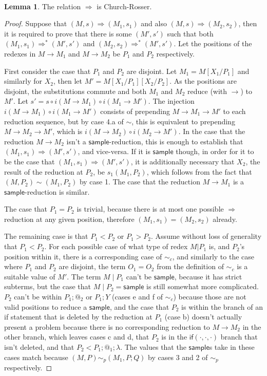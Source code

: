 \documentclass{article}
\newcommand{\tif}[3]{\mathsf{if}(#1, #2, #3)} %
\newcommand{\tsample}{\mathsf{sample}}
\theoremstyle{definition}
\theoremstyle{lemma}
\newtheorem{lemma}{Lemma}
\theoremstyle{remark}
\begin{document}
\paragraph{}
\begin{lemma}
The relation $\Rightarrow$ is Church-Rosser.
\end{lemma}
\begin{proof}
Suppose that $(M,s) \Rightarrow (M_1,s_1)$ and also $(M,s) \Rightarrow (M_2,s_2)$, then it is required to prove that there is some $(M',s')$ such that both $(M_1,s_1) \Rightarrow^* (M',s')$ and $(M_2,s_2) \Rightarrow^* (M',s')$. Let the positions of the redexes in $M \to M_1$ and $M \to M_2$ be $P_1$ and $P_2$ respectively.

First consider the case that $P_1$ and $P_2$ are disjoint. Let $M_1 = M[X_1/P_1]$ and similarly for $X_2$, then let $M' = M[X_1/P_1][X_2/P_2]$. As the positions are disjoint, the substitutions commute and both $M_1$ and $M_2$ reduce (with $\to$) to $M'$. 
Let $s' = s \circ i(M \to M_1) \circ i(M_1 \to M')$. 
The injection $i(M \to M_1) \circ i(M_1 \to M')$ consists of prepending $M \to M_1 \to M'$ to each reduction sequence, but by case 4.a of $\sim$, this is equivalent to prepending $M \to M_2 \to M'$, which is $i(M \to M_2) \circ i(M_2 \to M')$. 
In the case that the reduction $M \to M_2$ isn't a $\tsample$-reduction, this is enough to establish that $(M_1, s_1) \Rightarrow (M', s')$, and vice-versa. 
If it is $\tsample$ though, in order for it to be the case that $(M_1, s_1) \Rightarrow (M', s')$, it is additionally necessary that $X_2$, the result of the reduction at $P_2$, be $s_1(M_1, P_2)$, which follows from the fact that $(M, P_2) \sim (M_1, P_2)$ by case 1. 
The case that the reduction $M \to M_1$ is a $\tsample$-reduction is similar.

The case that $P_1 = P_2$ is trivial, because there is at most one possible $\Rightarrow$ reduction at any given position, therefore $(M_1, s_1) = (M_2, s_2)$ already.

The remaining case is that $P_1 < P_2$ or $P_1 > P_2$. 
Assume without loss of generality that $P_1 < P_2$. 
For each possible case of what type of redex $M | P_1$ is, and $P_2$'s position within it, there is a corresponding case of $\sim_c$, and similarly to the case where $P_1$ and $P_2$ are disjoint, the term $O_1 = O_2$ from the definition of $\sim_c$ is a suitable value of $M'$. 
The term $M \mid P_1$ can't be $\tsample$, because it has strict subterms, but the case that $M \mid P_2 = \tsample$ is still somewhat more complicated. 
$P_2$ can't be within $P_1 ; @_2$ or $P_1 ; Y$ (cases e and f of $\sim_c$) because those are not valid positions to reduce a $\tsample$, 
and the case that $P_2$ is within the branch of an if statement that is deleted by the reduction at $P_1$ (case b) doesn't actually present a problem because there is no corresponding reduction to $M \to M_2$ in the other branch, 
which leaves cases c and d, that $P_2$ is in the $\tif{\cdot}{\cdot}{\cdot}$ branch that isn't deleted, and that $P_2 < P_1 ; @_1 ; \lambda$.  
The values that the $\tsample$s take in these cases match because $(M,P) \sim_p (M_1, P;Q)$ by cases 3 and 2 of $\sim_p$ respectively.
\end{proof}
\end{document}
